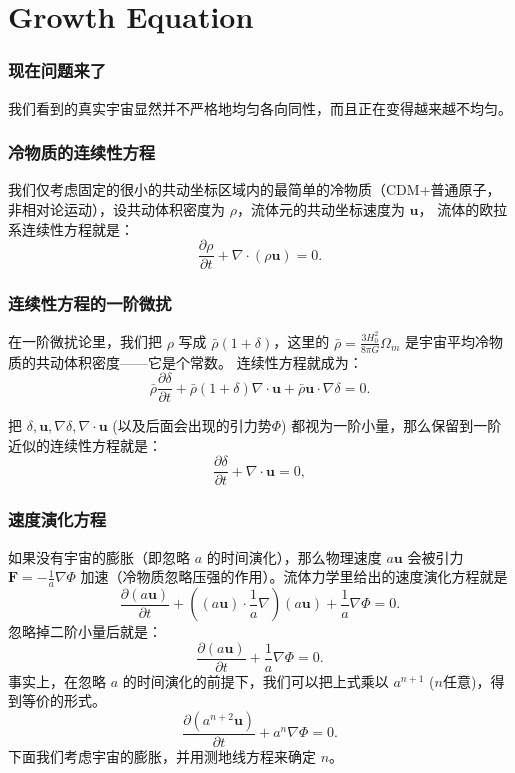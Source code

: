 \documentclass[CJK,13pt]{beamer}
\date{}
\begin{document}
  \bch

  \section{Growth Equation}

  \begin{frame}
    \frametitle{现在问题来了}
    
    我们看到的真实宇宙显然并不严格地均匀各向同性，而且正在变得越来越不均匀。
  \end{frame}


  \begin{frame}
    \frametitle{冷物质的连续性方程}
    我们仅考虑{\blue 固定的很小的共动坐标区域内}的最简单的冷物质（CDM+普通原子，非相对论运动），设共动体积密度为 $\rho$，流体元的共动坐标速度为 $\mathbf{u}$，
    流体的欧拉系连续性方程就是：
    $$ \frac{\partial \rho}{\partial t} + \nabla\cdot(\rho \mathbf{u}) = 0.$$
  \end{frame}

  
  \begin{frame}
    \frametitle{连续性方程的一阶微扰}
    在一阶微扰论里，我们把 $\rho$ 写成 $\bar{\rho}(1+\delta)$，这里的 $\bar{\rho} = \frac{3H_0^2}{8\pi G}\Omega_m$ 是宇宙平均冷物质的共动体积密度——它是个常数。
    连续性方程就成为：
    $$ \bar{\rho}\frac{\partial \delta}{\partial t} + \bar{\rho}(1+\delta)\nabla\cdot \mathbf{u} + \bar{\rho}\mathbf{u}\cdot \nabla\delta = 0.$$

    把 $\delta,\mathbf{u}, \nabla\delta, \nabla\cdot \mathbf{u}$ (以及后面会出现的引力势$\Phi$) 都视为一阶小量，那么保留到一阶近似的连续性方程就是：
    {\blue $$ \frac{\partial \delta}{\partial t} + \nabla\cdot \mathbf{u} = 0,$$}

  \end{frame}


  \begin{frame}
    \frametitle{速度演化方程}
    如果没有宇宙的膨胀（即忽略 $a$ 的时间演化），那么物理速度 $a\mathbf{u}$ 会被引力 $\mathbf{F}=-\frac{1}{a}\nabla \Phi$ 加速（冷物质忽略压强的作用）。流体力学里给出的速度演化方程就是
    $$\frac{\partial (a\mathbf{u})}{\partial t} +\left((a\mathbf{u})\cdot \frac{1}{a}\nabla\right)(a\mathbf{u}) + \frac{1}{a}\nabla\Phi = 0.$$
    忽略掉二阶小量后就是：
    $$\frac{\partial (a\mathbf{u})}{\partial t} + \frac{1}{a}\nabla\Phi = 0.$$
    事实上，在忽略 $a$ 的时间演化的前提下，我们可以把上式乘以 $a^{n+1}$ ($n$任意)，得到等价的形式。
    $$\frac{\partial (a^{n+2}\mathbf{u})}{\partial t} + a^n\nabla\Phi = 0.$$
    下面我们考虑宇宙的膨胀，并用测地线方程来确定 $n$。

    
  \end{frame}
\end{document}
